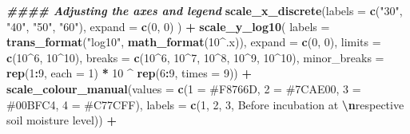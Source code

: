 \documentclass[
]{article}
\newenvironment{Shaded}{\begin{snugshade}}{\end{snugshade}}
\newcommand{\AttributeTok}[1]{\textcolor[rgb]{0.13,0.29,0.53}{#1}}
\newcommand{\DecValTok}[1]{\textcolor[rgb]{0.00,0.00,0.81}{#1}}
\newcommand{\DocumentationTok}[1]{\textcolor[rgb]{0.56,0.35,0.01}{\textbf{\textit{#1}}}}
\newcommand{\FunctionTok}[1]{\textcolor[rgb]{0.13,0.29,0.53}{\textbf{#1}}}
\newcommand{\NormalTok}[1]{#1}
\newcommand{\OtherTok}[1]{\textcolor[rgb]{0.56,0.35,0.01}{#1}}
\newcommand{\SpecialCharTok}[1]{\textcolor[rgb]{0.81,0.36,0.00}{\textbf{#1}}}
\newcommand{\StringTok}[1]{\textcolor[rgb]{0.31,0.60,0.02}{#1}}
\begin{document}
\begin{Shaded}
\begin{Highlighting}[]
  \DocumentationTok{\#\#\#\# Adjusting the axes and legend}
  \FunctionTok{scale\_x\_discrete}\NormalTok{(}\AttributeTok{labels =} \FunctionTok{c}\NormalTok{(}\StringTok{"30"}\NormalTok{, }\StringTok{"40"}\NormalTok{, }\StringTok{"50"}\NormalTok{, }\StringTok{"60"}\NormalTok{),}
                   \AttributeTok{expand =} \FunctionTok{c}\NormalTok{(}\DecValTok{0}\NormalTok{, }\DecValTok{0}\NormalTok{)}
\NormalTok{  ) }\SpecialCharTok{+}
  \FunctionTok{scale\_y\_log10}\NormalTok{(}
    \AttributeTok{labels =} \FunctionTok{trans\_format}\NormalTok{(}\StringTok{"log10"}\NormalTok{, }\FunctionTok{math\_format}\NormalTok{(}\DecValTok{10}\SpecialCharTok{\^{}}\NormalTok{.x)),}
    \AttributeTok{expand =} \FunctionTok{c}\NormalTok{(}\DecValTok{0}\NormalTok{, }\DecValTok{0}\NormalTok{),}
    \AttributeTok{limits =} \FunctionTok{c}\NormalTok{(}\DecValTok{10}\SpecialCharTok{\^{}}\DecValTok{6}\NormalTok{, }\DecValTok{10}\SpecialCharTok{\^{}}\DecValTok{10}\NormalTok{),}
    \AttributeTok{breaks =} \FunctionTok{c}\NormalTok{(}\DecValTok{10}\SpecialCharTok{\^{}}\DecValTok{6}\NormalTok{, }\DecValTok{10}\SpecialCharTok{\^{}}\DecValTok{7}\NormalTok{, }\DecValTok{10}\SpecialCharTok{\^{}}\DecValTok{8}\NormalTok{, }\DecValTok{10}\SpecialCharTok{\^{}}\DecValTok{9}\NormalTok{, }\DecValTok{10}\SpecialCharTok{\^{}}\DecValTok{10}\NormalTok{),}
    \AttributeTok{minor\_breaks =} \FunctionTok{rep}\NormalTok{(}\DecValTok{1}\SpecialCharTok{:}\DecValTok{9}\NormalTok{, }\AttributeTok{each =} \DecValTok{1}\NormalTok{) }\SpecialCharTok{*} \DecValTok{10} \SpecialCharTok{\^{}} \FunctionTok{rep}\NormalTok{(}\DecValTok{6}\SpecialCharTok{:}\DecValTok{9}\NormalTok{, }\AttributeTok{times =} \DecValTok{9}\NormalTok{)) }\SpecialCharTok{+}
  \FunctionTok{scale\_colour\_manual}\NormalTok{(}\AttributeTok{values =} \FunctionTok{c}\NormalTok{(}\StringTok{\textquotesingle{}1\textquotesingle{}} \OtherTok{=} \StringTok{\textquotesingle{}\#F8766D\textquotesingle{}}\NormalTok{, }\StringTok{\textquotesingle{}2\textquotesingle{}} \OtherTok{=} \StringTok{\textquotesingle{}\#7CAE00\textquotesingle{}}\NormalTok{, }\StringTok{\textquotesingle{}3\textquotesingle{}} \OtherTok{=} \StringTok{\textquotesingle{}\#00BFC4\textquotesingle{}}\NormalTok{, }\StringTok{\textquotesingle{}4\textquotesingle{}} \OtherTok{=} \StringTok{\textquotesingle{}\#C77CFF\textquotesingle{}}\NormalTok{),}
                      \AttributeTok{labels =} \FunctionTok{c}\NormalTok{(}\StringTok{\textquotesingle{}1\textquotesingle{}}\NormalTok{, }\StringTok{\textquotesingle{}2\textquotesingle{}}\NormalTok{, }\StringTok{\textquotesingle{}3\textquotesingle{}}\NormalTok{, }
                                 \StringTok{\textquotesingle{}Before incubation at }\SpecialCharTok{\textbackslash{}n}\StringTok{respective soil moisture level\textquotesingle{}}\NormalTok{)) }\SpecialCharTok{+}
  

\end{Highlighting}
\end{Shaded}
\end{document}
